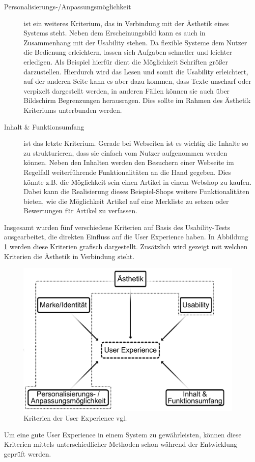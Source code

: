 \begin{description}
\item[Personalisierungs-/Anpassungsmöglichkeit] ist ein weiteres Kriterium, das in Verbindung mit der Ästhetik eines Systems steht. Neben dem Erscheinungsbild kann es auch in Zusammenhang mit der Usability stehen. Da flexible Systeme dem Nutzer die Bedienung erleichtern, lassen sich Aufgaben schneller und leichter erledigen. Als Beispiel hierfür dient die Möglichkeit Schriften größer darzustellen. \cite[S. 72]{Hartmann:2006vx}
Hierdurch wird das Lesen und somit die Usability erleichtert, auf der anderen Seite kann es aber dazu kommen, dass Texte unscharf oder verpixelt dargestellt werden, in anderen Fällen können sie auch über Bildschirm Begrenzungen herausragen. Dies sollte im Rahmen des Ästhetik Kriteriums unterbunden werden.\\
\item[Inhalt \& Funktionsumfang]ist das letzte Kriterium. Gerade bei Webseiten ist es wichtig die Inhalte so zu strukturieren, dass sie einfach vom Nutzer aufgenommen werden können. Neben den Inhalten werden den Besuchern einer Webseite im Regelfall weiterführende Funktionalitäten an die Hand gegeben. Dies könnte z.B. die Möglichkeit sein einen Artikel in einem Webshop zu kaufen. Dabei kann die Realisierung dieses Beispiel-Shops weitere Funktionalitäten bieten, wie die Möglichkeit Artikel auf eine Merkliste zu setzen oder Bewertungen für Artikel zu verfassen. \cite[S. 71]{Hartmann:2006vx}
\end{description}
Insgesamt wurden fünf verschiedene Kriterien auf Basis des Usability-Tests ausgearbeitet, die direkten Einfluss auf die User Experience haben. In Abbildung \ref{pic:UXJudgement} werden diese Kriterien grafisch dargestellt. Zusätzlich wird gezeigt mit welchen Kriterien die Ästhetik in Verbindung steht.
\begin{figure}[H]
    \centering
    \includegraphics[width=.8\textwidth]{files/ux/judgement}
    \caption{Kriterien der User Experience vgl. \cite[S. 71]{Hartmann:2006vx}}
    \label{pic:UXJudgement}
\end{figure}
Um eine gute User Experience in einem System zu gewährleisten, können diese Kriterien mittels unterschiedlicher Methoden schon während der Entwicklung geprüft werden.


